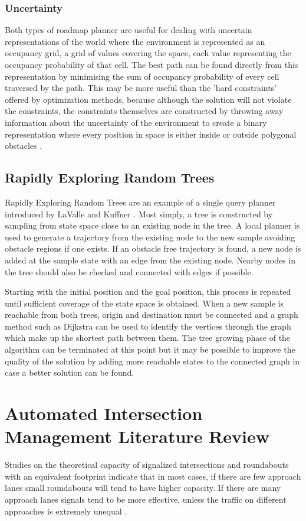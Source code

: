 \subsubsection{Uncertainty}
Both types of roadmap planner are useful for dealing with uncertain representations of the world where the environment is represented as an occupancy grid, a grid of values covering the space, each value representing the occupancy probability of that cell. The best path can be found directly from this representation by minimising the sum of occupancy probability of every cell traversed by the path. This may be more useful than the 'hard constraints' offered by optimization methods, because although the solution will not violate the constraints, the constraints themselves are constructed by throwing away information about the uncertainty of the environment to create a binary representation where every position in space is either inside or outside polygonal obstacles \cite{Pivtoraiko2009}.     

\subsection{Rapidly Exploring  Random Trees}
Rapidly Exploring Random Trees are an example of a single query planner introduced by LaValle and Kuffner \cite{LaValle2000}. Most simply, a tree is constructed by sampling from state space close to an existing node in the tree. A local planner is used to generate a trajectory from the existing node to the new sample avoiding obstacle regions if one exists. If an obstacle free trajectory is found, a new node is added at the sample state with an edge from the existing node. Nearby nodes in the tree should also be checked and connected with edges if possible. 

Starting with the initial position and the goal position, this process is repeated until sufficient coverage of the state space is obtained. When a new sample is reachable from both trees, origin and destination must be connected and a graph method such as Dijkstra can be used to identify the vertices through the graph which make up the shortest path between them. The tree growing phase of the algorithm can be terminated at this point but it may be possible to improve the quality of the solution by adding more reachable states to the connected graph in case  a better solution can be found.  

\section{Automated Intersection Management Literature Review} 
Studies on the theoretical capacity of signalized intersections and roundabouts with an equivalent footprint indicate that in most cases, if there are few approach lanes small roundabouts will tend to have higher capacity. If there are many approach lanes signals tend to be more effective, unless the traffic on different approaches is extremely unequal \cite{Jian-an2001}. 


